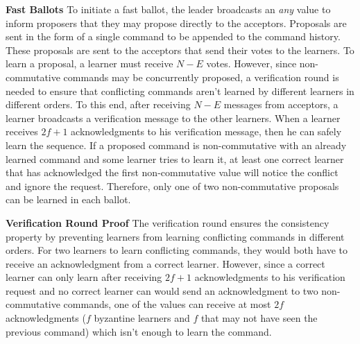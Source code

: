 \textbf{Fast Ballots} To initiate a fast ballot, the leader broadcasts an \textit{any} value to inform proposers that they may propose directly to the acceptors. Proposals are sent in the form of a single command to be appended to the command history. These proposals are sent to the acceptors that send their votes to the learners. To learn a proposal, a learner must receive $N-E$ votes. However, since non-commutative commands may be concurrently proposed, a verification round is needed to ensure that conflicting commands aren't learned by different learners in different orders. To this end, after receiving $N-E$ messages from acceptors, a learner broadcasts a verification message to the other learners. When a learner receives $2f+1$ acknowledgments to his verification message, then he can safely learn the sequence. If a proposed command is non-commutative with an already learned command and some learner tries to learn it, at least one correct learner that has acknowledged the first non-commutative value will notice the conflict and ignore the request. Therefore, only one of two non-commutative proposals can be learned in each ballot. \par
\textbf{Verification Round Proof} The verification round ensures the consistency property by preventing learners from learning conflicting commands in different orders. For two learners to learn conflicting commands, they would both have to receive an acknowledgment from a correct learner. However, since a correct learner can only learn after receiving $2f+1$ acknowledgments to his verification request and no correct learner can would send an acknowledgment to two non-commutative commands, one of the values can receive at most $2f$ acknowledgments ($f$ byzantine learners and $f$ that may not have seen the previous command) which isn't enough to learn the command.